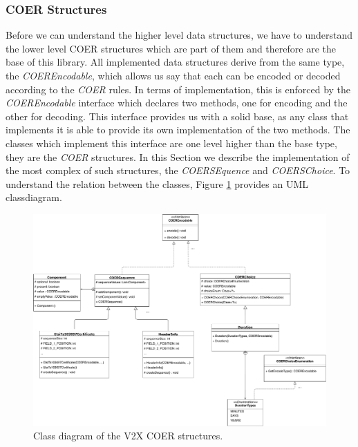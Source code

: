 \subsubsection{COER Structures}
Before we can understand the higher level data structures, we have to understand the lower level COER structures which are part of them and therefore are the base of this library. All implemented data structures derive from the same type, the \textit{COEREncodable}, which allows us say that each can be encoded or decoded according to the \textit{COER} rules. In terms of implementation, this is enforced by the \textit{COEREncodable} interface which declares two methods, one for encoding and the other for decoding. This interface provides us with a solid base, as any class that implements it is able to provide its own implementation of the two methods. The classes which implement this interface are one level higher than the base type, they are the \textit{COER} structures. In this Section we describe the implementation of the most complex of such structures, the \textit{COERSEquence} and \textit{COERSChoice}. To understand the relation between the classes, Figure \ref{fig:coer_structures} provides an UML classdiagram. 

\begin{figure}[t]
	\centering
	\includegraphics[width=1.1\textwidth]{Figures/coerstructures}
	\caption{\label{fig:coer_structures} Class diagram of the V2X {COER} structures.}
\end{figure}

